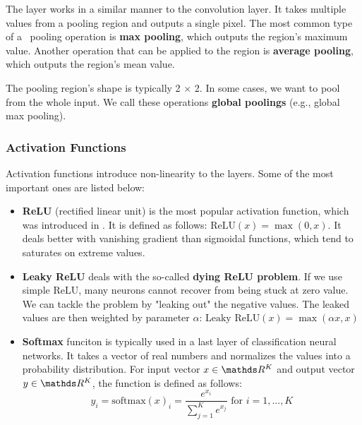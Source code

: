     The layer works in a similar manner to the convolution layer. It takes multiple
    values from a pooling region and outputs a single pixel. The most common type of
    a~ pooling operation is \textbf{max pooling}, which outputs the region's
    maximum value. Another operation that can be applied to the region is
    \textbf{average pooling}, which outputs the region's mean value.

    The pooling region's shape is typically 2 $\times$ 2. In some cases, we want to
    pool from the whole input. We call these operations \textbf{global poolings}
    (e.g., global max pooling).

    \subsubsection{Activation Functions}
    \label{afunctions}

    Activation functions introduce non-linearity to the layers. Some of the most
    important ones are listed below:
    \begin{itemize}
        \item \textbf{ReLU} (rectified linear unit) is the most popular activation
              function, which was introduced in \cite{pmlr-v15-glorot11a}. It is defined
              as follows: $\text{ReLU}(x) = \max(0, x)$. It deals better with vanishing
              gradient than sigmoidal functions, which tend to saturates on extreme values.
        \item \textbf{Leaky ReLU} deals with the so-called
              \textbf{dying ReLU problem}. If we use simple ReLU, many neurons cannot
              recover from being stuck at zero value. We can tackle the problem by
              "leaking out" the negative values. The leaked values are then weighted by
              parameter $\alpha$: $\text{Leaky ReLU}(x) = \max(\alpha x, x)$
        \item \textbf{Softmax} funciton is typically used in a last layer of
              classification neural networks. It takes a vector of real numbers and
              normalizes the values into a probability distribution. For input vector
              $x \in \real^K$ and output vector $y \in \real^K$, the function is defined
              as follows:
              $$
                  y_i = \text{softmax}(x)_i = \frac{e^{x_i}}{\sum\limits^{K}_{j = 1}
                      e^{x_j}} \text{ for } i = 1,...,K
              $$
    \end{itemize}

